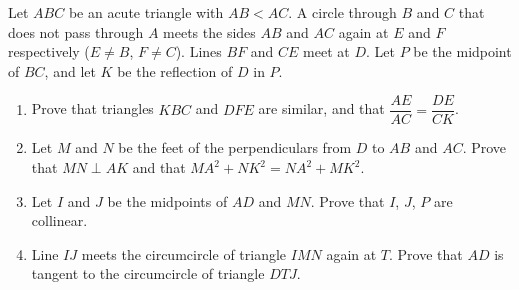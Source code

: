 Let $ABC$ be an acute triangle with $AB<AC$. A circle through $B$ and $C$ that does not pass through $A$ meets the sides $AB$ and $AC$ again at $E$ and $F$ respectively ($E\ne B$, $F\ne C$). Lines $BF$ and $CE$ meet at $D$. Let $P$ be the midpoint of $BC$, and let $K$ be the reflection of $D$ in $P$.
\begin{enumerate}
\item[(a)] Prove that triangles $KBC$ and $DFE$ are similar, and that $\dfrac{AE}{AC}=\dfrac{DE}{CK}$.
\item[(b)] Let $M$ and $N$ be the feet of the perpendiculars from $D$ to $AB$ and $AC$. Prove that $MN\perp AK$ and that $MA^2+NK^2=NA^2+MK^2$.
\item[(c)] Let $I$ and $J$ be the midpoints of $AD$ and $MN$. Prove that $I$, $J$, $P$ are collinear.
\item[(d)] Line $IJ$ meets the circumcircle of triangle $IMN$ again at $T$. Prove that $AD$ is tangent to the circumcircle of triangle $DTJ$.
\end{enumerate}
